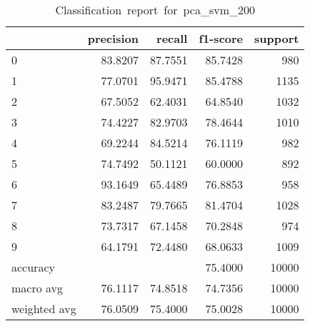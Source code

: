 \begin{table}[htb!]
    \centering
    \begin{tabular}{lrrrr}
        \toprule
                     & precision & recall  & f1-score & support \\
        \midrule
        0            & 83.8207   & 87.7551 & 85.7428  & 980     \\
        1            & 77.0701   & 95.9471 & 85.4788  & 1135    \\
        2            & 67.5052   & 62.4031 & 64.8540  & 1032    \\
        3            & 74.4227   & 82.9703 & 78.4644  & 1010    \\
        4            & 69.2244   & 84.5214 & 76.1119  & 982     \\
        5            & 74.7492   & 50.1121 & 60.0000  & 892     \\
        6            & 93.1649   & 65.4489 & 76.8853  & 958     \\
        7            & 83.2487   & 79.7665 & 81.4704  & 1028    \\
        8            & 73.7317   & 67.1458 & 70.2848  & 974     \\
        9            & 64.1791   & 72.4480 & 68.0633  & 1009    \\
        accuracy     &           &         & 75.4000  & 10000   \\
        macro avg    & 76.1117   & 74.8518 & 74.7356  & 10000   \\
        weighted avg & 76.0509   & 75.4000 & 75.0028  & 10000   \\
        \bottomrule
    \end{tabular}
    \caption{Classification\ report\ for\ pca\_svm\_200}
    \label{tab:classification-report-pca_svm_200}
\end{table}
